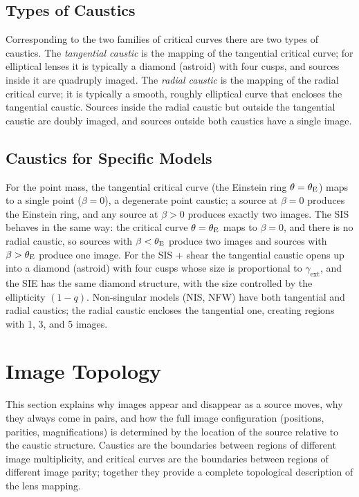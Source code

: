 \subsection{Types of Caustics}

Corresponding to the two families of critical curves there are two
types of caustics.  The \emph{tangential caustic} is the mapping of
the tangential critical curve; for elliptical lenses it is typically
a diamond (astroid) with four cusps, and sources inside it are
quadruply imaged.  The \emph{radial caustic} is the mapping of the
radial critical curve; it is typically a smooth, roughly elliptical
curve that encloses the tangential caustic.  Sources inside the
radial caustic but outside the tangential caustic are doubly imaged,
and sources outside both caustics have a single image.

\subsection{Caustics for Specific Models}

For the point mass, the tangential critical curve (the Einstein ring
$\theta = \theta_{\mathrm{E}}$) maps to a single point ($\beta = 0$), a
degenerate point caustic; a source at $\beta = 0$ produces the
Einstein ring, and any source at $\beta > 0$ produces exactly two
images.  The SIS behaves in the same way: the critical curve
$\theta = \theta_{\mathrm{E}}$ maps to $\beta = 0$, and there is no radial
caustic, so sources with $\beta < \theta_{\mathrm{E}}$ produce two images and
sources with $\beta > \theta_{\mathrm{E}}$ produce one image.  For the SIS +
shear the tangential caustic opens up into a diamond (astroid) with
four cusps whose size is proportional to $\gamma_{\mathrm{ext}}$,
and the SIE has the same diamond structure, with the size controlled
by the ellipticity $(1 - q)$.  Non-singular models (NIS, NFW) have
both tangential and radial caustics; the radial caustic encloses the
tangential one, creating regions with 1, 3, and 5 images.


\section{Image Topology}
\label{sec:image_topology}

This section explains why images appear and disappear as a source
moves, why they always come in pairs, and how the full image
configuration (positions, parities, magnifications) is determined
by the location of the source relative to the caustic structure.
Caustics are the boundaries between regions of different image
multiplicity, and critical curves are the boundaries between regions
of different image parity; together they provide a complete
topological description of the lens mapping.


